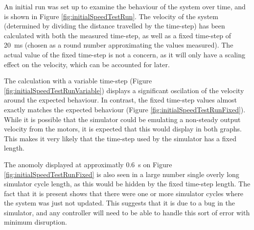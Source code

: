 \documentclass[10pt]{article}
\begin{document}
An initial run was set up to examine the behaviour of the system over time, and
is shown in Figure \ref{fig:initialSpeedTestRun}.  The velocity of the system
(determined by dividing the distance travelled by the time-step) has been
calculated with both the measured time-step, as well as a fixed time-step of
\SI{20}{\milli\second} (chosen as a round number approximating the values
measured). The actual value of the fixed time-step is not a concern, as it will
only have a scaling effect on the velocity, which can be accounted for later.

The calculation with a variable time-step (Figure
\ref{fig:initialSpeedTestRunVariable}) displays a significant oscilation of the
velocity around the expected behaviour.  In contrast, the fixed time-step values
almost exactly matches the expected behaviour (Figure
\ref{fig:initialSpeedTestRunFixed}).  While it is possible that the simulator
could be emulating a non-steady output velocity from the motors, it is expected
that this would display in both graphs.  This makes it very likely that the
time-step used by the simulator has a fixed length.

The anomoly displayed at approximatly \SI{0.6}{\second} on Figure
\ref{fig:initialSpeedTestRunFixed} is also seen in a large number  single overly
long simulator cycle length, as this would be hidden by the fixed time-step
length. The fact that it is present shows that there were one or more simulator
cycles where the system was just not updated.  This suggests that it is due to a
bug in the simulator, and any controller will need to be able to handle this
sort of error with minimum disruption.
\end{document}
